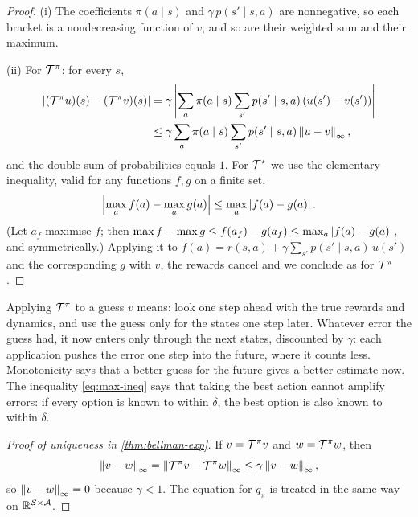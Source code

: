 \begin{proof}
  (i) The coefficients $\pi(a \mid s)$ and $\gamma\, p(s' \mid s, a)$ are
  nonnegative, so each bracket is a nondecreasing function of $v$, and so
  are their weighted sum and their maximum.

  (ii) For $\mathcal{T}^\pi$: for every $s$,
  \begin{align*}
    \left\lvert (\mathcal{T}^\pi u)(s) - (\mathcal{T}^\pi v)(s) \right\rvert
    &= \gamma \left\lvert \sum_a \pi(a \mid s) \sum_{s'} p(s' \mid s, a)
      \left(u(s') - v(s')\right) \right\rvert \\
    &\leq \gamma \sum_a \pi(a \mid s) \sum_{s'} p(s' \mid s, a)
      \left\lVert u - v \right\rVert_\infty,
  \end{align*}
  and the double sum of probabilities equals $1$. For $\mathcal{T}^\star$ we use the
  elementary inequality, valid for any functions $f, g$ on a finite set,
  \begin{equation}
    \label{eq:max-ineq}
    \left\lvert \max_a f(a) - \max_a g(a) \right\rvert \leq \max_a \left\lvert f(a) - g(a) \right\rvert.
  \end{equation}
  (Let $a_f$ maximise $f$; then $\max f - \max g \leq f(a_f) - g(a_f) \leq
  \max_a \left\lvert f(a) - g(a) \right\rvert$, and symmetrically.) Applying it to
  $f(a) = r(s, a) + \gamma \sum_{s'} p(s' \mid s, a)\, u(s')$ and the
  corresponding $g$ with $v$, the rewards cancel and we conclude as for
  $\mathcal{T}^\pi$.
\end{proof}

\begin{intuition}
  Applying $\mathcal{T}^\pi$ to a guess $v$ means: look one step ahead with the true
  rewards and dynamics, and use the guess only for the states one step
  later. Whatever error the guess had, it now enters only through the next
  states, discounted by $\gamma$: each application pushes the error one
  step into the future, where it counts less. Monotonicity says that a
  better guess for the future gives a better estimate now. The inequality
  \eqref{eq:max-ineq} says that taking the best action cannot amplify
  errors: if every option is known to within $\delta$, the best option is
  also known to within $\delta$.
\end{intuition}

\begin{proof}[Proof of uniqueness in \cref{thm:bellman-exp}]
  If $v = \mathcal{T}^\pi v$ and $w = \mathcal{T}^\pi w$, then
  \begin{equation*}
    \left\lVert v - w \right\rVert_\infty = \left\lVert \mathcal{T}^\pi v - \mathcal{T}^\pi w \right\rVert_\infty
    \leq \gamma \left\lVert v - w \right\rVert_\infty,
  \end{equation*}
  so $\left\lVert v - w \right\rVert_\infty = 0$ because $\gamma < 1$. The equation for $q_\pi$
  is treated in the same way on $\mathbb{R}^{\mathcal{S} \times \mathcal{A}}$.
\end{proof}

